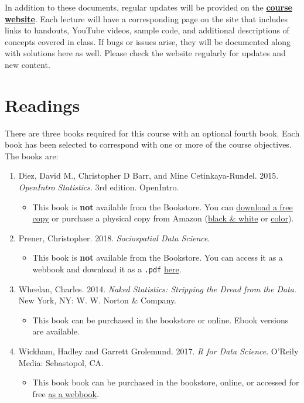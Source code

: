 \documentclass[]{book}
\providecommand{\tightlist}{%
  \setlength{\itemsep}{0pt}\setlength{\parskip}{0pt}}
\theoremstyle{definition}
\theoremstyle{definition}
\theoremstyle{definition}
\theoremstyle{remark}
\begin{document}
In addition to these documents, regular updates will be provided on the
\href{https://slu-soc5050.github.io}{\textbf{course website}}. Each
lecture will have a corresponding page on the site that includes links
to handouts, YouTube videos, sample code, and additional descriptions of
concepts covered in class. If bugs or issues arise, they will be
documented along with solutions here as well. Please check the website
regularly for updates and new content.

\hypertarget{readings}{%
\section{Readings}\label{readings}}

There are three books required for this course with an optional fourth
book. Each book has been selected to correspond with one or more of the
course objectives. The books are:

\begin{enumerate}
\def\labelenumi{\arabic{enumi}.}
\tightlist
\item
  Diez, David M., Christopher D Barr, and Mine Cetinkaya-Rundel. 2015.
  \emph{OpenIntro Statistics}. 3rd edition. OpenIntro.

  \begin{itemize}
  \tightlist
  \item
    This book is \textbf{not} available from the Bookstore. You can
    \href{https://www.openintro.org/stat/textbook.php}{download a free
    copy} or purchase a physical copy from Amazon
    (\href{https://www.amazon.com/dp/1943450048/}{black \& white} or
    \href{https://www.amazon.com/dp/1943450056/}{color}).
  \end{itemize}
\item
  Prener, Christopher. 2018. \emph{Sociospatial Data Science}.

  \begin{itemize}
  \tightlist
  \item
    This book is \textbf{not} available from the Bookstore. You can
    access it as a webbook and download it as a \texttt{.pdf}
    \href{https://chris-prener.github.io/SSDSBook/}{here}.
  \end{itemize}
\item
  Wheelan, Charles. 2014. \emph{Naked Statistics: Stripping the Dread
  from the Data}. New York, NY: W. W. Norton \& Company.

  \begin{itemize}
  \tightlist
  \item
    This book can be purchased in the bookstore or online. Ebook
    versions are available.
  \end{itemize}
\item
  Wickham, Hadley and Garrett Grolemund. 2017. \emph{R for Data
  Science}. O'Reily Media: Sebastopol, CA.

  \begin{itemize}
  \tightlist
  \item
    This book book can be purchased in the bookstore, online, or
    accessed for free \href{http://r4ds.had.co.nz}{as a webbook}.
  \end{itemize}
\end{enumerate}
\end{document}
